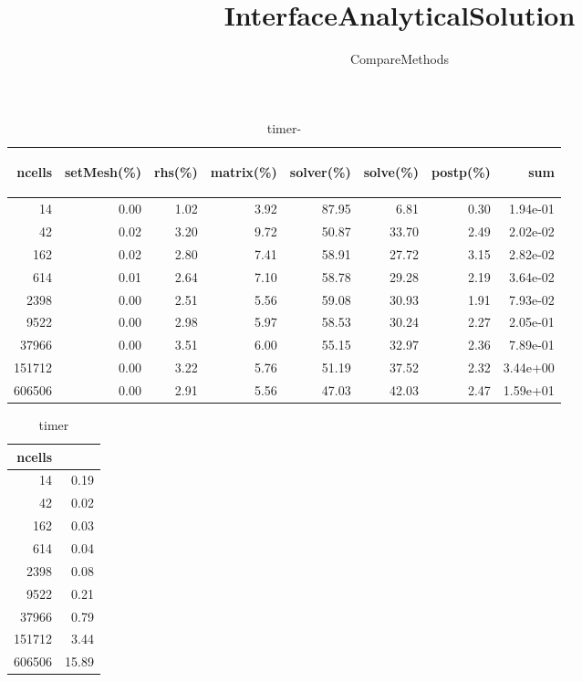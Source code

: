 \documentclass[11pt]{article}
\author{CompareMethods}
\title{InterfaceAnalyticalSolution}
\newcommand{\sw}[1]{\begin{sideways} #1 \end{sideways}}
\begin{document}

\maketitle
%
%
\begin{table}[!htbp]
\begin{center}
\begin{tabular}{r||r|r|r|r|r|r|r}
\sw{ncells} &\sw{setMesh(\%)} &\sw{rhs(\%)} &\sw{matrix(\%)} &\sw{solver(\%)} &\sw{solve(\%)} &\sw{postp(\%)} &\sw{sum}\\\hline\hline
             14&    0.00&    1.02&    3.92&   87.95&    6.81&    0.30&  1.94e-01\\\hline
             42&    0.02&    3.20&    9.72&   50.87&   33.70&    2.49&  2.02e-02\\\hline
            162&    0.02&    2.80&    7.41&   58.91&   27.72&    3.15&  2.82e-02\\\hline
            614&    0.01&    2.64&    7.10&   58.78&   29.28&    2.19&  3.64e-02\\\hline
           2398&    0.00&    2.51&    5.56&   59.08&   30.93&    1.91&  7.93e-02\\\hline
           9522&    0.00&    2.98&    5.97&   58.53&   30.24&    2.27&  2.05e-01\\\hline
          37966&    0.00&    3.51&    6.00&   55.15&   32.97&    2.36&  7.89e-01\\\hline
         151712&    0.00&    3.22&    5.76&   51.19&   37.52&    2.32&  3.44e+00\\\hline
         606506&    0.00&    2.91&    5.56&   47.03&   42.03&    2.47&  1.59e+01\\\hline
\end{tabular}
\caption{timer-}
\end{center}
\label{tab:timer-}
\end{table}
%
%
\begin{table}[!htbp]
\begin{center}
\begin{tabular}{r||r}
ncells           &                 \\\hline\hline
             14&      0.19\\\hline
             42&      0.02\\\hline
            162&      0.03\\\hline
            614&      0.04\\\hline
           2398&      0.08\\\hline
           9522&      0.21\\\hline
          37966&      0.79\\\hline
         151712&      3.44\\\hline
         606506&     15.89\\\hline
\end{tabular}
\caption{timer}
\end{center}
\label{tab:timer}
\end{table}
\end{document}
